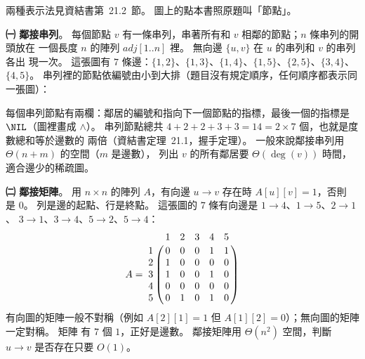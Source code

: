 \begin{pastsoln}
兩種表示法見資結書第~21.2~節。 圖上的點本書照原題叫「節點」。

\textbf{㈠ 鄰接串列}。 每個節點 $v$ 有一條串列，串著所有和 $v$ 相鄰的節點；$n$ 條串列的開頭放在
一個長度 $n$ 的陣列 $\mathit{adj}[1..n]$ 裡。 無向邊 $\{u, v\}$ 在 $u$ 的串列和 $v$ 的串列各出
現一次。 這張圖有 $7$ 條邊：$\{1,2\}$、$\{1,3\}$、$\{1,4\}$、$\{1,5\}$、$\{2,5\}$、$\{3,4\}$、$\{4,5\}$。
串列裡的節點依編號由小到大排（題目沒有規定順序，任何順序都表示同一張圖）：
\begin{center}
\end{center}
每個串列節點有兩欄：鄰居的編號和指向下一個節點的指標，最後一個的指標是 $\NIL$（圖裡畫成
$\wedge$）。 串列節點總共 $4 + 2 + 2 + 3 + 3 = 14 = 2 \times 7$ 個，也就是度數總和等於邊數的
兩倍（資結書定理~21.1，握手定理）。 一般來說鄰接串列用 $\Theta(n + m)$ 的空間（$m$ 是邊數），
列出 $v$ 的所有鄰居要 $\Theta(\deg(v))$ 時間，適合邊少的稀疏圖。

\textbf{㈡ 鄰接矩陣}。 用 $n \times n$ 的陣列 $A$，有向邊 $u \to v$ 存在時 $A[u][v] = 1$，否則
是 $0$。 列是邊的起點、行是終點。 這張圖的 $7$ 條有向邊是 $1 \to 4$、$1 \to 5$、$2 \to 1$、
$3 \to 1$、$3 \to 4$、$5 \to 2$、$5 \to 4$：
\[
A = \bordermatrix{
  & 1 & 2 & 3 & 4 & 5 \cr
1 & 0 & 0 & 0 & 1 & 1 \cr
2 & 1 & 0 & 0 & 0 & 0 \cr
3 & 1 & 0 & 0 & 1 & 0 \cr
4 & 0 & 0 & 0 & 0 & 0 \cr
5 & 0 & 1 & 0 & 1 & 0 \cr}
\]
有向圖的矩陣一般不對稱（例如 $A[2][1] = 1$ 但 $A[1][2] = 0$）；無向圖的矩陣一定對稱。 矩陣
有 $7$ 個 $1$，正好是邊數。 鄰接矩陣用 $\Theta(n^2)$ 空間，判斷 $u \to v$ 是否存在只要 $O(1)$。


\end{pastsoln}
